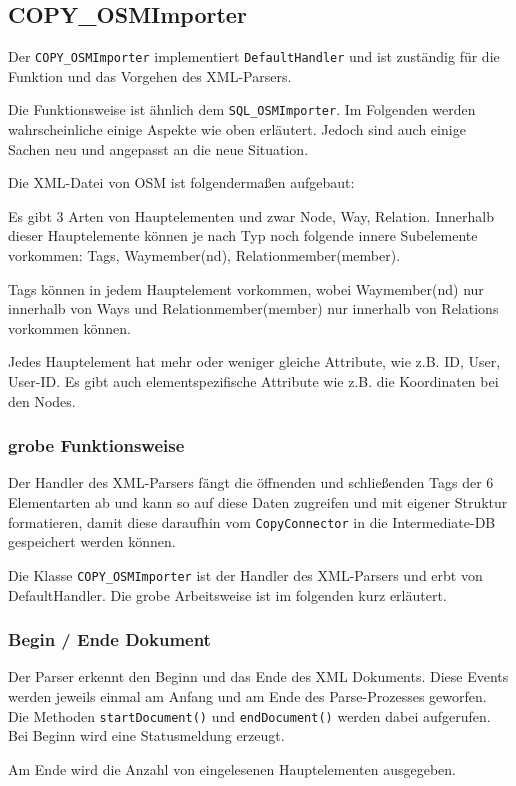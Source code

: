 \subsection{COPY\_OSMImporter}
Der {\tt COPY\_OSMImporter} implementiert {\tt DefaultHandler} und ist zuständig für die Funktion und das Vorgehen des XML-Parsers.

Die Funktionsweise ist ähnlich dem {\tt SQL\_OSMImporter}. Im Folgenden werden wahrscheinliche einige Aspekte wie oben erläutert. Jedoch sind auch einige Sachen neu und angepasst an die neue Situation.

Die XML-Datei von OSM ist folgendermaßen aufgebaut:

Es gibt 3 Arten von Hauptelementen und zwar Node, Way, Relation. Innerhalb dieser Hauptelemente können je nach Typ noch folgende innere Subelemente vorkommen: Tags, Waymember(nd), Relationmember(member).

Tags können in jedem Hauptelement vorkommen, wobei Waymember(nd) nur innerhalb von Ways und Relationmember(member) nur innerhalb von Relations vorkommen können.

Jedes Hauptelement hat mehr oder weniger gleiche Attribute, wie z.B. ID, User, User-ID. Es gibt auch elementspezifische Attribute wie z.B. die Koordinaten bei den Nodes.

\subsubsection{grobe Funktionsweise}
Der Handler des XML-Parsers fängt die öffnenden und schließenden Tags der 6 Elementarten ab und kann so auf diese Daten zugreifen und mit eigener Struktur formatieren, damit diese daraufhin vom {\tt CopyConnector} in die Intermediate-DB gespeichert werden können.

Die Klasse {\tt COPY\_OSMImporter} ist der Handler des XML-Parsers und erbt von DefaultHandler. Die grobe Arbeitsweise ist im folgenden kurz erläutert.

\subsubsection{Begin / Ende Dokument}
Der Parser erkennt den Beginn und das Ende des XML Dokuments. Diese Events werden jeweils
einmal am Anfang und am Ende des Parse-Prozesses geworfen. Die Methoden {\tt startDocument()}
und {\tt endDocument()} werden dabei aufgerufen. Bei Beginn wird eine Statusmeldung erzeugt.

Am Ende wird die Anzahl von eingelesenen Hauptelementen ausgegeben.


